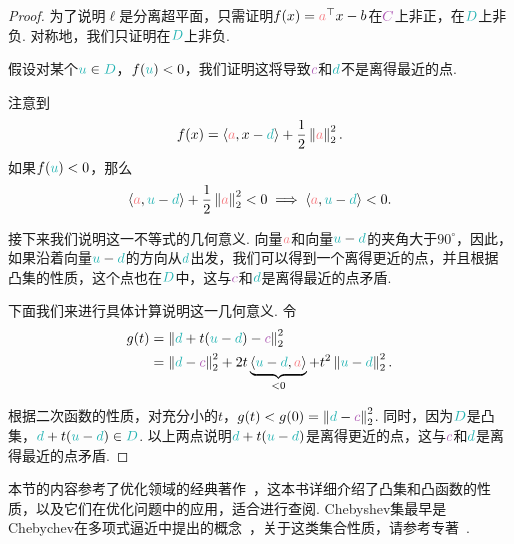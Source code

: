 \begin{proof}
    为了说明$\ell$是分离超平面，只需证明$f(x) = \textcolor{Salmon}{a}^\top x - b$在$\light{C}$上非正，在$\contrastlight{D}$上非负. 对称地，我们只证明在$\contrastlight{D}$上非负.
    
    假设对某个$\contrastlight{u} \in \contrastlight{D}$，$f(\contrastlight{u}) < 0$，我们证明这将导致$\light{c}$和$\contrastlight{d}$不是离得最近的点.
    
    注意到
    \[
    f(x) = \inner{\textcolor{Salmon}{a}}{x - \contrastlight{d}} + \frac{1}{2} \norm{\textcolor{Salmon}{a}}_2^2.
    \]
    如果$f(\contrastlight{u}) < 0$，那么
    \[
    \inner{\textcolor{Salmon}{a}}{\contrastlight{u} - \contrastlight{d}} + \frac{1}{2} \norm{\textcolor{Salmon}{a}}_2^2 < 0 \implies \inner{\textcolor{Salmon}{a}}{\contrastlight{u} - \contrastlight{d}} < 0.
    \]
    
    接下来我们说明这一不等式的几何意义. 向量$\textcolor{Salmon}{a}$和向量$\contrastlight{u} - \contrastlight{d}$的夹角大于$90^\circ$，因此，如果沿着向量$\contrastlight{u} - \contrastlight{d}$的方向从$\contrastlight{d}$出发，我们可以得到一个离得更近的点，并且根据凸集的性质，这个点也在$\contrastlight{D}$中，这与$\light{c}$和$\contrastlight{d}$是离得最近的点矛盾.
    
    下面我们来进行具体计算说明这一几何意义. 令
    \begin{align*}
        g(t) &= \norm{\contrastlight{d} + t (\contrastlight{u} - \contrastlight{d}) - \light{c}}_2^2\\
        &= \norm{\contrastlight{d} - \light{c}}_2^2 + 2t \underbrace{\inner{\contrastlight{u} - \contrastlight{d}}{\textcolor{Salmon}{a}}}_{< 0} + t^2 \norm{\contrastlight{u} - \contrastlight{d}}_2^2.
    \end{align*}
    
    根据二次函数的性质，对充分小的$t$，$g(t) < g(0) = \norm{\contrastlight{d} - \light{c}}_2^2$. 同时，因为$\contrastlight{D}$是凸集，$\contrastlight{d} + t(\contrastlight{u} - \contrastlight{d}) \in \contrastlight{D}$. 以上两点说明$\contrastlight{d} + t(\contrastlight{u} - \contrastlight{d})$是离得更近的点，这与$\light{c}$和$\contrastlight{d}$是离得最近的点矛盾.
\end{proof}

\begin{remark}
    本节的内容参考了优化领域的经典著作~\cite{boydConvexOptimization2004}，这本书详细介绍了凸集和凸函数的性质，以及它们在优化问题中的应用，适合进行查阅. Chebyshev集最早是Chebychev在多项式逼近中提出的概念~\cite{chebyshevQuestionsSmallestQuantities1947}，关于这类集合性质，请参考专著~\cite{bauschkeConvexAnalysisMonotone2017}.
\end{remark}


